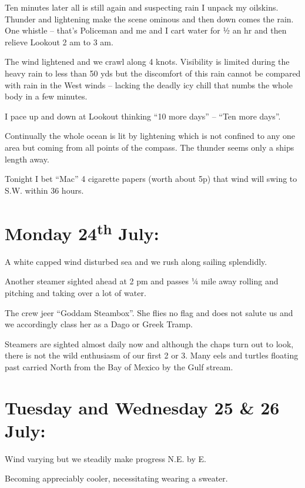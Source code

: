\documentclass[
  11pt,
  msmallroyalvopaper
]{memoir}
\begin{document}
Ten minutes later all is still again and suspecting rain I unpack my
oilskins. Thunder and lightening make the scene ominous and then down
comes the rain. One whistle -- that's Policeman and me and I cart water
for ½ an hr and then relieve Lookout 2 am to 3 am.

The wind lightened and we crawl along 4 knots. Visibility is limited
during the heavy rain to less than 50 yds but the discomfort of this
rain cannot be compared with rain in the West winds -- lacking the
deadly icy chill that numbs the whole body in a few minutes.

I pace up and down at Lookout thinking ``10 more days'' -- ``Ten more
days''.

Continually the whole ocean is lit by lightening which is not confined
to any one area but coming from all points of the compass. The thunder
seems only a ships length away.

Tonight I bet ``Mac'' 4 cigarette papers (worth about 5p) that wind will
swing to S.W. within 36 hours.

\hypertarget{monday-24th-july}{%
\section{\texorpdfstring{Monday 24\textsuperscript{th}
July:}{Monday 24th July:}}\label{monday-24th-july}}

A white capped wind disturbed sea and we rush along sailing splendidly.

Another steamer sighted ahead at 2 pm and passes ¼ mile away rolling and
pitching and taking over a lot of water.

The crew jeer ``Goddam Steambox''. She flies no flag and does not salute
us and we accordingly class her as a Dago or Greek Tramp.

Steamers are sighted almost daily now and although the chaps turn out to
look, there is not the wild enthusiasm of our first 2 or 3. Many eels
and turtles floating past carried North from the Bay of Mexico by the
Gulf stream.

\hypertarget{tuesday-and-wednesday-25-26-july}{%
\section{Tuesday and Wednesday 25 \& 26
July:}\label{tuesday-and-wednesday-25-26-july}}

Wind varying but we steadily make progress N.E. by E.

Becoming appreciably cooler, necessitating wearing a sweater.
\end{document}
